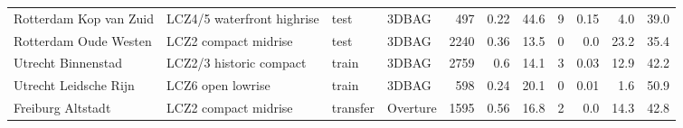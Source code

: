 \begin{table}[!h]
\begin{tabular}{llllrrrrrrr}
Rotterdam Kop van Zuid & LCZ4/5 waterfront highrise & test & 3DBAG & 497 & 0.22 & 44.6 & 9 & 0.15 & 4.0 & 39.0 \\
Rotterdam Oude Westen & LCZ2 compact midrise & test & 3DBAG & 2240 & 0.36 & 13.5 & 0 & 0.0 & 23.2 & 35.4 \\
Utrecht Binnenstad & LCZ2/3 historic compact & train & 3DBAG & 2759 & 0.6 & 14.1 & 3 & 0.03 & 12.9 & 42.2 \\
Utrecht Leidsche Rijn & LCZ6 open lowrise & train & 3DBAG & 598 & 0.24 & 20.1 & 0 & 0.01 & 1.6 & 50.9 \\
Freiburg Altstadt & LCZ2 compact midrise & transfer & Overture & 1595 & 0.56 & 16.8 & 2 & 0.0 & 14.3 & 42.8 \\
\bottomrule
\end{tabular}
\end{table}
